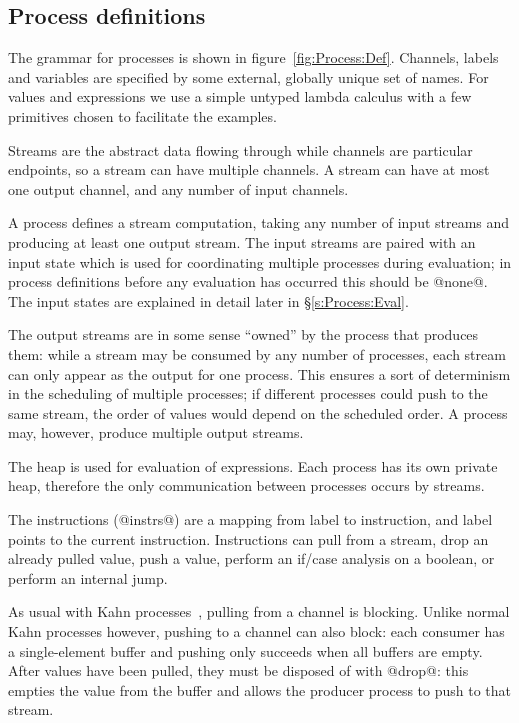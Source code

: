 \clearpage{}
\subsection{Process definitions}



The grammar for processes is shown in figure~\ref{fig:Process:Def}.
Channels, labels and variables are specified by some external, globally unique set of names.
For values and expressions we use a simple untyped lambda calculus with a few primitives chosen to facilitate the examples.

Streams are the abstract data flowing through while channels are particular endpoints, so a stream can have multiple channels.
A stream can have at most one output channel, and any number of input channels.

A process defines a stream computation, taking any number of input streams and producing at least one output stream.
The input streams are paired with an input state which is used for coordinating multiple processes during evaluation; in process definitions before any evaluation has occurred this should be @none@.
The input states are explained in detail later in \S\ref{s:Process:Eval}.

The output streams are in some sense ``owned'' by the process that produces them: while a stream may be consumed by any number of processes, each stream can only appear as the output for one process.
This ensures a sort of determinism in the scheduling of multiple processes; if different processes could push to the same stream, the order of values would depend on the scheduled order.
A process may, however, produce multiple output streams.

The heap is used for evaluation of expressions.
Each process has its own private heap, therefore the only communication between processes occurs by streams.

The instructions (@instrs@) are a mapping from label to instruction, and label points to the current instruction.
Instructions can pull from a stream, drop an already pulled value, push a value, perform an if/case analysis on a boolean, or perform an internal jump.

As usual with Kahn processes~\cite{kahn1976coroutines}, pulling from a channel is blocking.
Unlike normal Kahn processes however, pushing to a channel can also block: each consumer has a single-element buffer and pushing only succeeds when all buffers are empty.
After values have been pulled, they must be disposed of with @drop@: this empties the value from the buffer and allows the producer process to push to that stream.


